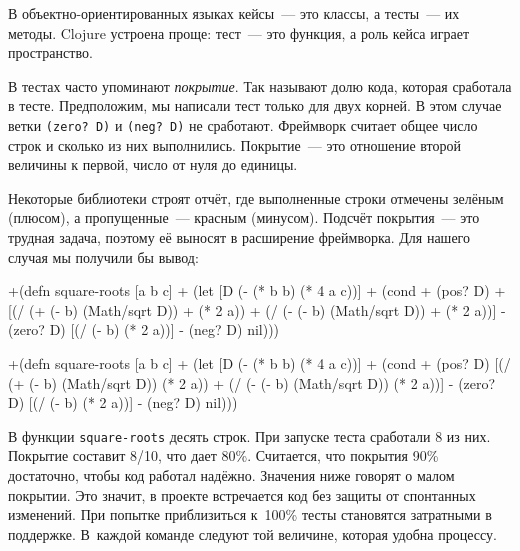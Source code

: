 \fi

В объектно-ориентированных языках кейсы~--- это классы, а тесты~--- их
методы. Clojure устроена проще: тест~--- это функция, а роль кейса играет
пространство.


В тестах часто упоминают \emph{покрытие}. Так называют долю кода, которая
сработала в тесте. Предположим, мы написали тест только для двух корней. В этом
случае ветки \verb|(zero? D)| и \verb|(neg? D)| не сработают. Фреймворк считает
общее число строк и сколько из них выполнились. Покрытие~--- это отношение второй
величины к первой, число от нуля до единицы.

Некоторые библиотеки строят отчёт, где выполненные строки отмечены зелёным
(плюсом), а пропущенные~--- красным (минусом). Подсчёт покрытия~--- это трудная задача,
поэтому её выносят в расширение фреймворка. Для нашего случая мы получили бы
вывод:

\ifx\devicetype\mobile

\begin{english}
  \begin{diff}
+(defn square-roots [a b c]
+  (let [D (- (* b b) (* 4 a c))]
+    (cond
+      (pos? D)
+      [(/ (+ (- b) (Math/sqrt D))
+          (* 2 a))
+       (/ (- (- b) (Math/sqrt D))
+          (* 2 a))]
-      (zero? D) [(/ (- b) (* 2 a))]
-      (neg? D) nil)))
  \end{diff}
\end{english}

\else

\begin{english}
  \begin{diff}
+(defn square-roots [a b c]
+  (let [D (- (* b b) (* 4 a c))]
+    (cond
+      (pos? D) [(/ (+ (- b) (Math/sqrt D)) (* 2 a))
+                (/ (- (- b) (Math/sqrt D)) (* 2 a))]
-      (zero? D) [(/ (- b) (* 2 a))]
-      (neg? D) nil)))
  \end{diff}
\end{english}
\fi


\ifx\devicetype\mobile
В функции \verb|square-roots| десять строк. При запуске теста сработали 8 из
них. Покрытие составит 8/10, что дает 80\%. Считается, что покрытия
90\% достаточно, чтобы код работал надёжно. Значения ниже говорят о малом
покрытии. Это значит, в проекте встречается код без защиты от спонтанных
изменений. При попытке приблизиться к~100\% тесты становятся затратными в
поддержке. В~каждой команде следуют той величине, которая удобна процессу.

